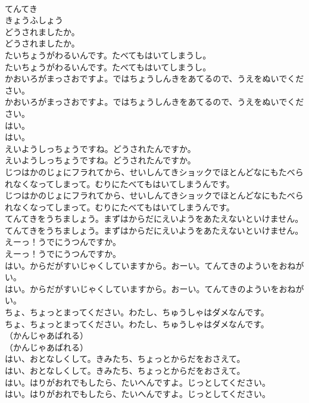 \documentclass[8pt]{extreport}
\begin{document}
\begin{CJK}{UTF8}{min}
\\	てんてき
\\	きょうふしょう
\\	どうされましたか。
\\	どうされましたか。
\\	たいちょうがわるいんです。たべてもはいてしまうし。
\\	たいちょうがわるいんです。たべてもはいてしまうし。
\\	かおいろがまっさおですよ。ではちょうしんきをあてるので、うえをぬいでください。
\\	かおいろがまっさおですよ。ではちょうしんきをあてるので、うえをぬいでください。
\\	はい。
\\	はい。
\\	えいようしっちょうですね。どうされたんですか。
\\	えいようしっちょうですね。どうされたんですか。
\\	じつはかのじょにフラれてから、せいしんてきショックでほとんどなにもたべられなくなってしまって。むりにたべてもはいてしまうんです。
\\	じつはかのじょにフラれてから、せいしんてきショックでほとんどなにもたべられなくなってしまって。むりにたべてもはいてしまうんです。
\\	てんてきをうちましょう。まずはからだにえいようをあたえないといけません。
\\	てんてきをうちましょう。まずはからだにえいようをあたえないといけません。
\\	えーっ！うでにうつんですか。
\\	えーっ！うでにうつんですか。
\\	はい。からだがすいじゃくしていますから。おーい。てんてきのよういをおねがい。
\\	はい。からだがすいじゃくしていますから。おーい。てんてきのよういをおねがい。
\\	ちょ、ちょっとまってください。わたし、ちゅうしゃはダメなんです。
\\	ちょ、ちょっとまってください。わたし、ちゅうしゃはダメなんです。
\\	（かんじゃあばれる）
\\	（かんじゃあばれる）
\\	はい、おとなしくして。きみたち、ちょっとからだをおさえて。
\\	はい、おとなしくして。きみたち、ちょっとからだをおさえて。
\\	はい。はりがおれでもしたら、たいへんですよ。じっとしてください。
\\	はい。はりがおれでもしたら、たいへんですよ。じっとしてください。

\end{CJK}
\end{document}
